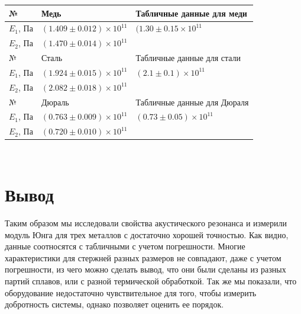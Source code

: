 \documentclass[a4paper, 12pt]{article}%
\begin{document}
\begin{table}[h]
\begin{tabular}{|l|l|l|}
\hline
№         & Медь                         & Табличные данные для меди   \\ \hline
$E_1$, Па & $(1.409\pm0.012)\times10^{11}$ & $(1.30\pm0.15\times10^{11}$   \\ \cline{1-2}
$E_2$, Па & $(1.470\pm0.014)\times10^{11}$ &                             \\ \hline
№         & Сталь                        & Табличные данные для стали  \\ \hline
$E_1$, Па & $(1.924\pm0.015)\times10^{11}$ & $(2.1\pm0.1)\times10^{11}$    \\ \cline{1-2}
$E_2$, Па & $(2.082\pm0.018)\times10^{11}$ &                             \\ \hline
№         & Дюраль                       & Табличные данные для Дюраля \\ \hline
$E_1$, Па & $(0.763\pm0.009)\times10^{11}$ & $(0.73\pm0.05)\times10^{11}$  \\ \cline{1-2}
$E_2$, Па & $(0.720\pm0.010)\times10^{11}$ &                             \\ \hline
\end{tabular}
\end{table}
\\
\section{Вывод}
Таким образом мы исследовали свойства акустического резонанса и измерили модуль Юнга для трех металлов с достаточно хорошей точностью. Как видно, данные соотносятся с табличными с учетом погрешности. Многие характеристики для стержней разных размеров не совпадают, даже с учетом погрешности, из чего можно сделать вывод, что они были сделаны из разных партий сплавов, или с разной термической обработкой. Так же мы показали, что оборудование недостаточно чувствительное для того, чтобы измерить добротность системы, однако позволяет оценить ее порядок.
\end{document}

